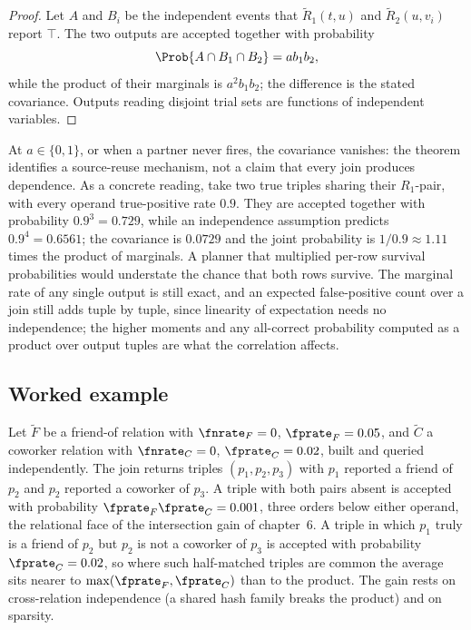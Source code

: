 \begin{proof}
Let $A$ and $B_i$ be the independent events that $\tilde R_1(t, u)$ and $\tilde
R_2(u, v_i)$ report $\top$. The two outputs are accepted together with probability
\[
  \Prob{A \cap B_1 \cap B_2} = a b_1 b_2,
\]
while the product of their marginals is $a^2 b_1 b_2$; the difference is the
stated covariance. Outputs reading disjoint
trial sets are functions of independent variables.
\end{proof}

At $a \in \{0, 1\}$, or when a partner never fires, the covariance vanishes: the
theorem identifies a source-reuse mechanism, not a claim that every join produces
dependence. As a concrete reading, take two true triples sharing their $R_1$-pair,
with every operand true-positive rate $0.9$. They are accepted together with
probability $0.9^3 = 0.729$, while an independence assumption predicts $0.9^4 =
0.6561$; the covariance is $0.0729$ and the joint probability is $1/0.9 \approx
1.11$ times the product of marginals. A planner that multiplied per-row survival
probabilities would understate the chance that both rows survive. The marginal
rate of any single output is still exact, and an expected false-positive count
over a join still adds tuple by tuple, since linearity of expectation needs no
independence; the higher moments and any all-correct probability computed as a
product over output tuples are what the correlation affects.

\subsection*{Worked example}

Let $\tilde F$ be a friend-of relation with $\fnrate_F = 0$, $\fprate_F = 0.05$,
and $\tilde C$ a coworker relation with $\fnrate_C = 0$, $\fprate_C = 0.02$, built
and queried independently. The join returns triples $(p_1, p_2, p_3)$ with $p_1$
reported a friend of $p_2$ and $p_2$ reported a coworker of $p_3$. A triple with
both pairs absent is accepted with probability $\fprate_F \fprate_C = 0.001$, three
orders below either operand, the relational face of the intersection gain of
chapter~6. A triple in which $p_1$ truly is a friend of $p_2$ but $p_2$ is not a
coworker of $p_3$ is accepted with probability $\fprate_C = 0.02$, so where such
half-matched triples are common the average sits nearer to $\max(\fprate_F,
\fprate_C)$ than to the product. The gain rests on cross-relation independence
(a shared hash family breaks the product) and on sparsity.

